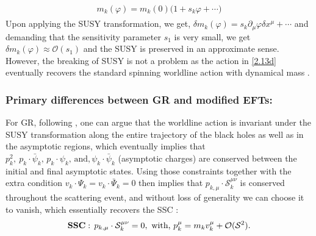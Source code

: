 \begin{align}
    \begin{split}
        m_{k}(\varphi)=m_{k}(0)\Big(1+s_k \varphi +\cdots)
    \end{split}
\end{align}
Upon applying the SUSY transformation, we get, $\delta m_{k}(\varphi)=s_k \partial_{\mu}\varphi \delta x^\mu+\cdots$ and demanding that the sensitivity parameter $s_1$ is very small, we get $\delta m_k(\varphi)\approx \mathcal{O}(s_1)$ and the SUSY is preserved in an approximate sense. However, the breaking of SUSY is not a problem as the action in \eqref{2.13d} eventually recovers the standard spinning worldline action with dynamical mass \cite{Levi:2018nxp}. 
\par
\par
\subsubsection*{Primary differences between GR and modified EFTs:}
For GR, following \cite{Jakobsen:2021zvh}, one can argue that the worldline action is invariant under the SUSY transformation along the entire trajectory of the black holes as well as in the asymptotic regions, which eventually implies that $p_k^2,\ p_k\cdot \bar\psi_k,\,p_k\cdot \psi_k,\,\textrm{and,}\,\psi_k\cdot \bar\psi_k$ (asymptotic charges) are conserved between the initial and final asymptotic states. Using those constraints together with the extra condition $v_k\cdot \Psi_k=v_k\cdot \bar\Psi_k=0$ then implies that $p_{k,\mu} \cdot \mathcal{S}_k^{\mu\nu}$ is conserved throughout the scattering event, and without loss of generality we can choose it to vanish, which essentially recovers the SSC \cite{1967JMP.....8.1591D,Corinaldesi:1951pb,1964NCim...34..317D}:
\begin{align}
    \textrm{\bf SSC}: \, p_{k,\mu} \cdot \mathcal{S}_k^{\mu\nu}=0,\,\, \textrm{with,}\,\,
     p_k^\mu=m_k v_k^\mu+\mathcal{O}(\mathcal{S}^2).
    \label{SSC17}
\end{align}
